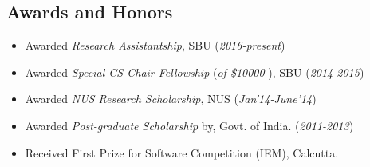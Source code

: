 \documentclass{res}
\begin{document}
\begin{resume}

 

 
 
 
\section{Awards and Honors}
   \begin{itemize}
   \item Awarded {\it Research Assistantship}, SBU ({\it 2016-present})
   \item Awarded {\it Special CS Chair Fellowship} ({\it of \$10000} ), SBU ({\it 2014-2015})
   \item Awarded {\it NUS Research Scholarship}, NUS ({\it Jan'14-June'14})
   \item Awarded {\it Post-graduate Scholarship} by, Govt. of India. ({\it 2011-2013}) 
   \item Received {\color{blue} First Prize} for Software Competition (IEM), Calcutta.
   \end{itemize}


\end{resume}
\end{document}
